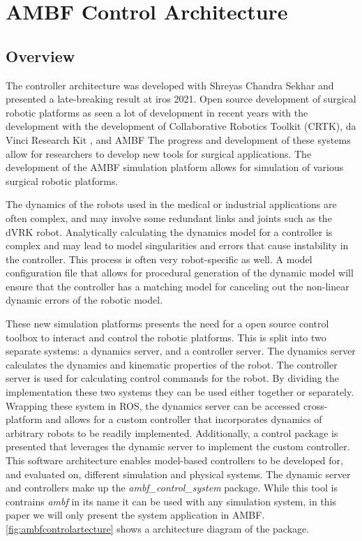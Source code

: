  
 
 \section{AMBF Control Architecture}
 \label{sec:controlarchitecture}
 
 \subsection{Overview}
 The controller architecture was developed with Shreyas Chandra Sekhar and presented a late-breaking result at iros 2021. Open source development of surgical robotic platforms as seen a lot of development in recent years with the development with the development of Collaborative Robotics Toolkit (CRTK)\cite{su2020collaborative}, da Vinci Research Kit \cite{d2021accelerating}, and AMBF The progress and development of these systems allow for researchers to develop new tools for surgical applications. The development of the  AMBF simulation platform allows for simulation of various surgical robotic platforms. 

The dynamics of the robots used in the medical or industrial applications are often complex, and may involve some redundant links and joints such as the dVRK robot\cite{wang2019convex}. Analytically calculating the dynamics model for a controller is complex and may lead to model singularities and errors that cause instability in the controller. This process is often very robot-specific as well. A model configuration file that allows for procedural generation of the dynamic model will ensure that the controller has a matching model for canceling out the non-linear dynamic errors of the robotic model.

These new simulation platforms presents the need for a open source control toolbox to interact and control the robotic platforms. This is split into two separate systems: a dynamics server, and a controller server. The dynamics server calculates the dynamics and kinematic properties of the robot. The controller server is used for calculating control commands for the robot. By dividing the implementation these two systems they can be used either together or separately.  Wrapping these system in ROS, the dynamics server can be accessed cross-platform and allows for a custom controller that incorporates dynamics of arbitrary robots to be readily implemented. Additionally, a control package is presented that leverages the dynamic server to implement the custom controller. This software architecture enables model-based controllers to be developed for, and evaluated on, different simulation and physical systems.  The dynamic server and controllers make up the \textit{ambf\_control\_system} package. While this tool is contrains \textit{ambf} in its name it can be used with any simulation system, in this paper we will only present the system application in AMBF. \autoref{fig:ambfcontrolartecture} shows a architecture diagram of the package. 
 

